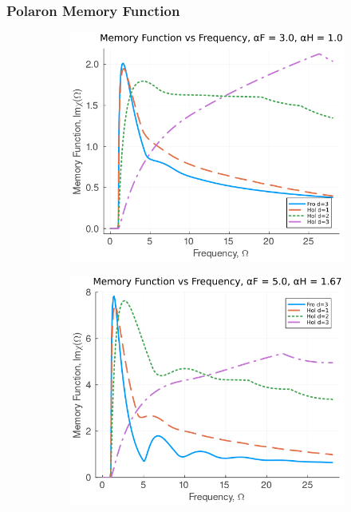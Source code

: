 \subsubsection{Polaron Memory Function}

\begin{figure}
\centering
  \begin{subfigure}[b]{0.49\textwidth}
    \includegraphics[width=\textwidth]{figures/im_mem_freq_3_1.png}
  \end{subfigure}
  \hfill
  \begin{subfigure}[b]{0.49\textwidth}
    \includegraphics[width=\textwidth]{figures/im_mem_freq_5_167.png}

\end{subfigure}
\end{figure}
